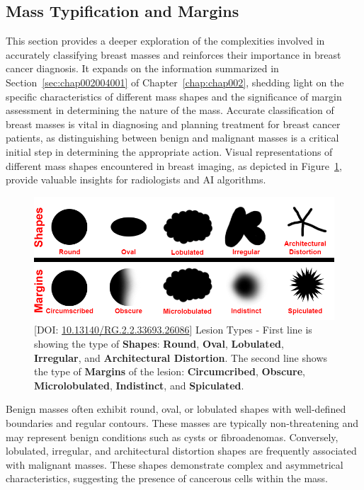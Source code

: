 \subsection{Mass Typification and Margins}
\label{sec:app001004001}

This section provides a deeper exploration of the complexities involved in accurately classifying breast masses and reinforces their importance in breast cancer diagnosis.
It expands on the information summarized in Section~\ref{sec:chap002004001} of Chapter~\ref{chap:chap002}, shedding light on the specific characteristics of different mass shapes and the significance of margin assessment in determining the nature of the mass.
Accurate classification of breast masses is vital in diagnosing and planning treatment for breast cancer patients, as distinguishing between benign and malignant masses is a critical initial step in determining the appropriate action.
Visual representations of different mass shapes encountered in breast imaging, as depicted in Figure~\ref{fig:fig021}, provide valuable insights for radiologists and \ac{AI} algorithms.

\begin{figure}[htpb]
\centering
\includegraphics[width=\columnwidth]{images/fig021}
\caption{[DOI: \href{https://doi.org/10.13140/RG.2.2.33693.26086}{10.13140/RG.2.2.33693.26086}] Lesion Types - First line is showing the type of {\bf Shapes}: {\bf Round}, {\bf Oval}, {\bf Lobulated}, {\bf Irregular}, and {\bf Architectural Distortion}. The second line shows the type of {\bf Margins} of the lesion: {\bf Circumcribed}, {\bf Obscure}, {\bf Microlobulated}, {\bf Indistinct}, and {\bf Spiculated}.}
\label{fig:fig021}
\end{figure}

Benign masses often exhibit round, oval, or lobulated shapes with well-defined boundaries and regular contours.
These masses are typically non-threatening and may represent benign conditions such as cysts or fibroadenomas.
Conversely, lobulated, irregular, and architectural distortion shapes are frequently associated with malignant masses.
These shapes demonstrate complex and asymmetrical characteristics, suggesting the presence of cancerous cells within the mass.

